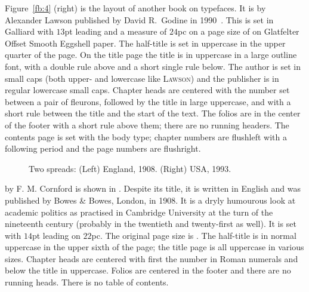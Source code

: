 \documentclass[10pt,letterpaper,extrafontsizes]{memoir}
\begin{document}
   Figure~\ref{fb:4} (right) is the layout of another book on typefaces.
It is  by Alexander Lawson published by
David R.~Godine in 1990~\autocite{LAWSON90}.
This is set in Galliard with $13$pt leading and a measure of $24$pc on
a page size of  on Glatfelter 
Offset Smooth Eggshell paper. The half-title
is set in uppercase in the upper quarter of the page. On the 
title page the title is in uppercase in a large outline 
font, with a double rule above and a short single rule below. The author
is set in small caps (both upper- and lowercase like \textsc{Lawson})
and the publisher is in regular lowercase small caps.
Chapter heads are centered with the number set between
a pair of fleurons, followed by the title in 
large uppercase, and with
a short rule between the title and the start of the text. 
The folios
are in the center of the footer with a short rule
above them; there are no running headers. The contents
page is set with the body type; chapter numbers are flushleft with a 
following period and the page numbers are flushright.



\begin{figure}
\centering
\begin{minipage}[b]{\pwlayi}
\end{minipage}
\hfill
\begin{minipage}[b]{\pwlayi}
\end{minipage}
\caption[Two spreads: England, 1908 and USA, 1993]%
        {Two spreads: (Left) England, 1908.
         (Right) USA, 1993.} \label{fb:5}
\end{figure}

     by F. M. Cornford is shown in
. Despite its title, it is written in English and was published
by Bowes \& Bowes, London, in 1908. It is a dryly humourous look at academic
politics as practised in Cambridge University at the turn of the nineteenth
century (probably in the twentieth and twenty-first as well). 
It is set with $14$pt leading
on $22$pc. The original page size is .
The half-title 
is in normal uppercase in the upper
sixth of the page; the title page is all uppercase in
various sizes. Chapter heads are centered with first 
the number in Roman numerals and below the title in uppercase.
Folios are centered in the footer 
and there are no running heads. There is no table of contents.
\end{document}
